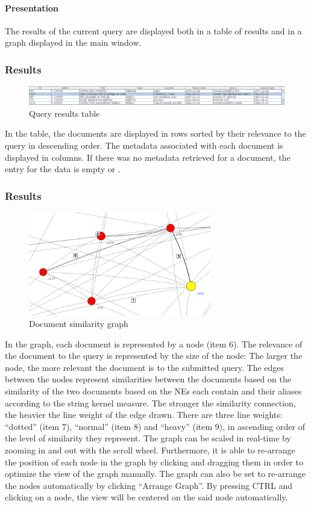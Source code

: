 \paragraph{Presentation}
The results of the current query are displayed both in a table of results and in a graph displayed in the main window.

\subsubsection{Results}
\begin{figure}[h]
\centering
\caption{Query results table}
\includegraphics[width=160mm]{table.png}
\end{figure}

In the table, the documents are displayed in rows sorted by their relevance to the query in descending order. The metadata associated with each document is displayed in columns. If there was no metadata retrieved for a document, the entry for the data is empty or .

\subsubsection{Results}
\begin{figure}[h]
\centering
\caption{Document similarity graph}
\includegraphics[width=80mm]{nodecloseup.png}
\end{figure}

In the graph, each document is represented by a node (item 6). The relevance of the document to the query is represented by the size of the node: The larger the node, the more relevant the document is to the submitted query. The edges between the nodes represent similarities between the documents based on the similarity of the two documents based on the NEs each contain and their aliases according to the string kernel measure. The stronger the similarity connection, the heavier the line weight of the edge drawn. There are three line weights: ``dotted'' (item 7), ``normal'' (item 8) and ``heavy'' (item 9), in ascending order of the level of similarity they represent. The graph can be scaled in real-time by zooming in and out with the scroll wheel. Furthermore, it is able to re-arrange the position of each node in the graph by clicking and dragging them in order to optimize the view of the graph manually. The graph can also be set to re-arrange the nodes automatically by clicking ``Arrange Graph''. By pressing CTRL and clicking on a node, the view will be centered on the said node automatically.

